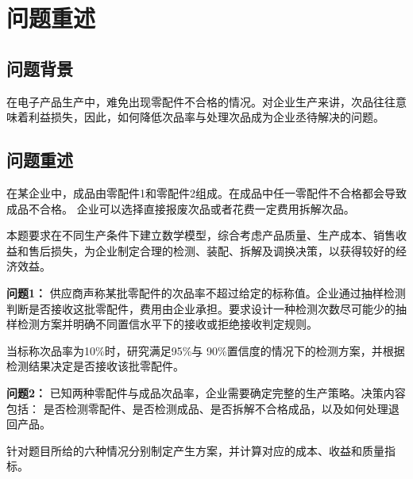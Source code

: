 \documentclass[withoutpreface,bwprint]{cumcmthesis}
\numberwithin{equation}{section}
\begin{document}











\vspace{-1.4cm} 
\section{问题重述}
\subsection{问题背景}

在电子产品生产中，难免出现零配件不合格的情况。对企业生产来讲，次品往往意味着利益损失，因此，如何降低次品率与处理次品成为企业丞待解决的问题。









\subsection{问题重述}
在某企业中，成品由零配件1和零配件2组成。在成品中任一零配件不合格都会导致成品不合格。
企业可以选择直接报废次品或者花费一定费用拆解次品。

本题要求在不同生产条件下建立数学模型，综合考虑产品质量、生产成本、销售收益和售后损失，为企业制定合理的检测、装配、拆解及调换决策，以获得较好的经济效益。

\textbf{问题1：}  供应商声称某批零配件的次品率不超过给定的标称值。企业通过抽样检测判断是否接收这批零配件，费用由企业承担。要求设计一种检测次数尽可能少的抽样检测方案并明确不同置信水平下的接收或拒绝接收判定规则。

当标称次品率为10\%时，研究满足95\%与 90\%置信度的情况下的检测方案，并根据检测结果决定是否接收该批零配件。


\textbf{问题2：}  已知两种零配件与成品次品率，企业需要确定完整的生产策略。决策内容包括：
是否检测零配件、是否检测成品、是否拆解不合格成品，以及如何处理退回产品。

针对题目所给的六种情况分别制定产生方案，并计算对应的成本、收益和质量指标。
\end{document}
